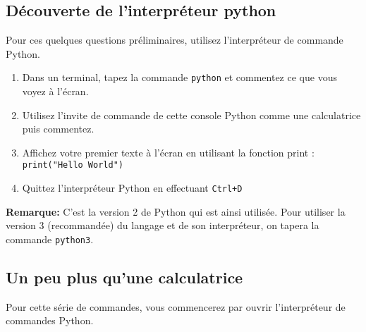 
\subsection{Découverte de l'interpréteur python}

Pour ces quelques questions  préliminaires, utilisez l'interpréteur de
commande Python.

\begin{enumerate}

\item Dans un terminal, tapez la commande \texttt{python} et commentez
  ce que vous voyez à l'écran.

\item Utilisez l'invite de commande  de cette console Python comme une
  calculatrice puis commentez.

\item Affichez votre premier texte  à l'écran en utilisant la fonction
  print : \\ \texttt{print("Hello World")}

\item Quittez l'interpréteur Python en effectuant \texttt{Ctrl+D}

\end{enumerate}

\noindent \textbf{Remarque:} C'est la version 2 de Python qui est ainsi utilisée.
Pour utiliser la version 3 (recommandée) du langage et de son interpréteur,
on tapera la commande \texttt{python3}.


\subsection{Un peu plus qu'une calculatrice}

Pour   cette  série   de   commandes,  vous   commencerez  par   ouvrir
l'interpréteur de commandes Python.

